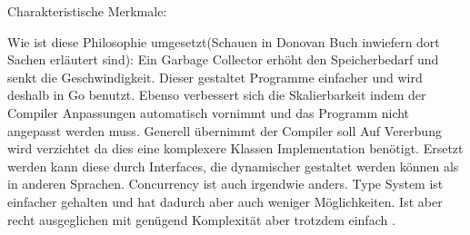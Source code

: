 Charakteristische Merkmale: 

Wie ist diese Philosophie umgesetzt(Schauen in Donovan Buch inwiefern dort Sachen erläutert sind):
Ein Garbage Collector erhöht den Speicherbedarf und senkt die Geschwindigkeit. Dieser gestaltet Programme einfacher und wird deshalb in Go benutzt. Ebenso verbessert sich die Skalierbarkeit indem der Compiler Anpassungen automatisch vornimmt und das Programm nicht angepasst werden muss. Generell übernimmt der Compiler soll Auf Vererbung wird verzichtet da dies eine komplexere Klassen Implementation benötigt. Ersetzt werden kann diese durch Interfaces, die dynamischer gestaltet werden können als in anderen Sprachen. 
Concurrency ist auch irgendwie anders.
Type System ist einfacher gehalten und hat dadurch aber auch weniger Möglichkeiten. Ist aber recht ausgeglichen mit genügend Komplexität aber trotzdem einfach \cite{donovan_go_2016}.